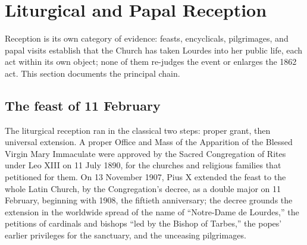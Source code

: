 \section{Liturgical and Papal Reception}

Reception is its own category of evidence: feasts, encyclicals,
pilgrimages, and papal visits establish that the Church has taken
Lourdes into her public life, each act within its own object; none
of them re-judges the event or enlarges the 1862 act. This section
documents the principal chain.

\subsection{The feast of 11 February}

The liturgical reception ran in the classical two steps: proper
grant, then universal extension. A proper Office and Mass of the
Apparition of the Blessed Virgin Mary Immaculate were approved by
the Sacred Congregation of Rites under Leo XIII on 11 July 1890,
for the churches and religious families that petitioned for them.
On 13 November 1907, Pius X extended the feast to the whole Latin
Church, by the Congregation's  decree, as a
double major on 11 February, beginning with 1908, the fiftieth
anniversary; the decree grounds the extension in the worldwide
spread of the name of ``Notre-Dame de Lourdes,'' the petitions of
cardinals and bishops ``led by the Bishop of Tarbes,'' the popes'
earlier privileges for the sanctuary, and the unceasing
pilgrimages.

